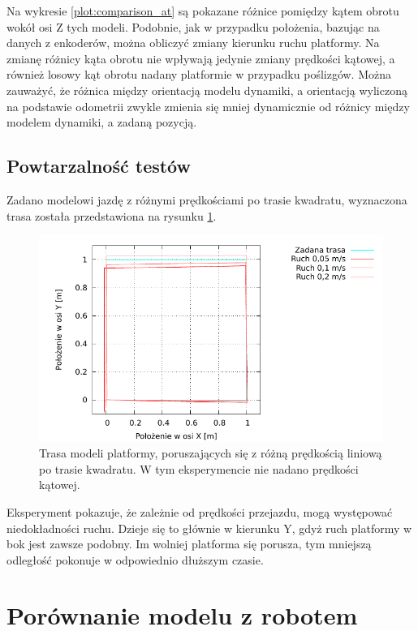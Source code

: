 			Na wykresie \ref{plot:comparison_at} są pokazane różnice pomiędzy kątem obrotu wokół osi Z tych modeli.
			Podobnie, jak w przypadku położenia, bazując na danych z enkoderów, można obliczyć zmiany kierunku ruchu platformy.
			Na zmianę różnicy kąta obrotu nie wpływają jedynie zmiany prędkości kątowej, a również losowy kąt obrotu nadany platformie w przypadku poślizgów.
			Można zauważyć, że różnica między orientacją modelu dynamiki, a orientacją wyliczoną na podstawie odometrii zwykle zmienia się mniej dynamicznie od 
			różnicy między modelem dynamiki, a zadaną pozycją.
			
	\subsection{Powtarzalność testów}
		Zadano modelowi jazdę z różnymi prędkościami po trasie kwadratu, wyznaczona trasa została przedstawiona na rysunku \ref{plot:repetitions_xy}.
		
		\begin{figure}[H]
			\centering
			\includegraphics[width=\textwidth]{plots/repetitions_xy.pdf}
				\caption{Trasa modeli platformy, poruszających się z różną prędkością liniową po trasie kwadratu. W tym eksperymencie nie nadano prędkości kątowej.}
			\label{plot:repetitions_xy}
		\end{figure}
		
		Eksperyment pokazuje, że zależnie od prędkości przejazdu, mogą występować niedokładności ruchu. Dzieje się to głównie w kierunku Y, gdyż ruch
		platformy w bok jest zawsze podobny. Im wolniej platforma się porusza, tym mniejszą odległość pokonuje w odpowiednio dłuższym czasie. 
		 
\section{Porównanie modelu z robotem}
